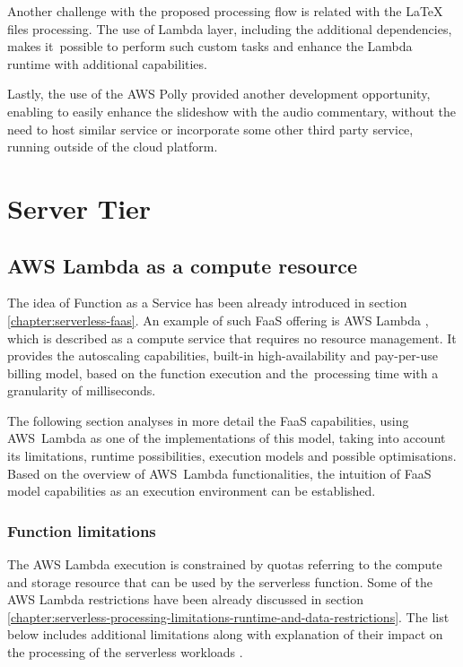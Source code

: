Another challenge with the proposed processing flow is related with the LaTeX files processing. The use of Lambda layer, including the additional dependencies, makes it~possible to perform such custom tasks and enhance the Lambda runtime with additional capabilities.

Lastly, the use of the AWS Polly provided another development opportunity, enabling to easily enhance the slideshow with the audio commentary, without the need to host similar service or incorporate some other third party service, running outside of the cloud platform.

\section{Server Tier}

\subsection{AWS Lambda as a compute resource} \label{chapter:lambda-function-as-a-compute-resource}

The idea of Function as a Service has been already introduced in section \ref{chapter:serverless-faas}.
An example of such FaaS offering is AWS Lambda \cite{AWSLambda}, which is described as a compute service that requires no resource management. It provides the autoscaling capabilities, built-in high-availability and pay-per-use billing model, based on the function execution and the~processing time with a granularity of milliseconds. 

The following section analyses in more detail the FaaS capabilities, using AWS~Lambda as one of the implementations of this model, taking into account its limitations, runtime possibilities, execution models and possible optimisations.
Based on the overview of AWS~Lambda functionalities, the intuition of FaaS model capabilities as an execution environment can be established.

\subsubsection{Function limitations} \label{chapter:lambda-function-limitations}

The AWS Lambda execution is constrained by quotas referring to the compute and storage resource that can be used by the serverless function.
Some of the AWS Lambda restrictions have been already discussed in section \ref{chapter:serverless-processing-limitations-runtime-and-data-restrictions}.
The list below includes additional limitations along with explanation of their impact on the processing of the serverless workloads \cite{AWSLambdaQuotas}.

